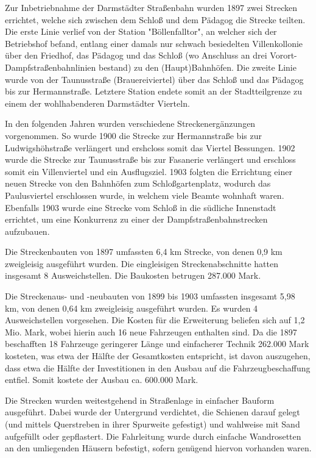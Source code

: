 Zur Inbetriebnahme der Darmstädter Straßenbahn wurden 1897 zwei Strecken errichtet,
welche sich zwischen dem Schloß und dem Pädagog die Strecke teilten. Die erste Linie
verlief von der Station "Böllenfalltor", an welcher sich der Betriebshof befand, entlang
einer damals nur schwach besiedelten Villenkollonie über den Friedhof, das Pädagog und
das Schloß (wo Anschluss an drei Vorort-Dampfstraßenbahnlinien bestand) zu den
(Haupt)Bahnhöfen. Die zweite Linie wurde von der Taunusstraße (Brauereiviertel) über das
Schloß und das Pädagog bis zur Hermannstraße. Letztere Station endete somit an der
Stadtteilgrenze zu einem der wohlhabenderen Darmstädter Vierteln.

In den folgenden Jahren wurden verschiedene Streckenergänzungen vorgenommen. So wurde
1900 die Strecke zur Hermannstraße bis zur Ludwigshöhstraße verlängert und ershcloss
somit das Viertel Bessungen. 1902 wurde die Strecke zur Taunusstraße bis zur Fasanerie
verlängert und erschloss somit ein Villenviertel und ein Ausflugsziel. 1903 folgten die
Errichtung einer neuen Strecke von den Bahnhöfen zum Schloßgartenplatz, wodurch das
Paulusviertel erschlossen wurde, in welchem viele Beamte wohnhaft waren. Ebenfalls 1903
wurde eine Strecke vom Schloß in die südliche Innenstadt errichtet, um eine Konkurrenz zu
einer der Dampfstraßenbahnstrecken aufzubauen.

Die Streckenbauten von 1897 umfassten 6,4 km Strecke, von denen 0,9 km zweigleisig
ausgeführt wurden. Die eingleisigen Streckenabschnitte hatten insgesamt 8 Ausweichstellen.
Die Baukosten betrugen 287.000 Mark.

Die Streckenaus- und -neubauten von 1899 bis 1903 umfassten insgesamt 5,98 km, von denen
0,64 km zweigleisig ausgeführt wurden. Es wurden 4 Ausweichstellen vorgesehen. Die Kosten
für die Erweiterung beliefen sich auf 1,2 Mio. Mark, wobei hierin auch 16 neue Fahrzeugen
enthalten sind. Da die 1897 beschafften 18 Fahrzeuge geringerer Länge und einfacherer
Technik 262.000 Mark kosteten, was etwa der Hälfte der Gesamtkosten entspricht, ist davon
auszugehen, dass etwa die Hälfte der Investitionen in den Ausbau auf die
Fahrzeugbeschaffung entfiel. Somit kostete der Ausbau ca. 600.000 Mark.

Die Strecken wurden weitestgehend in Straßenlage in einfacher Bauform ausgeführt. Dabei
wurde der Untergrund verdichtet, die Schienen darauf gelegt (und mittels Querstreben in
ihrer Spurweite gefestigt) und wahlweise mit Sand aufgefüllt oder gepflastert. Die
Fahrleitung wurde durch einfache Wandrosetten an den umliegenden Häusern befestigt,
sofern genügend hiervon vorhanden waren.

